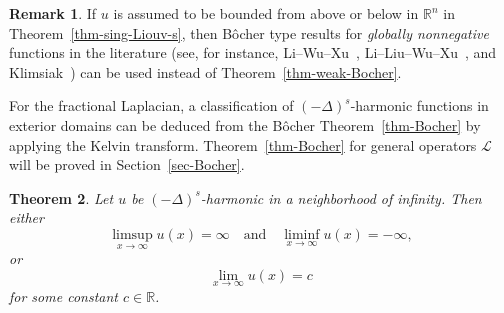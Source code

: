 \documentclass[11pt]{amsart}
\theoremstyle{plain}
\newtheorem{theorem}{Theorem}[section]
\theoremstyle{definition}
\newtheorem{remark}[theorem]{Remark}
\numberwithin{equation}{section}
\begin{document}
\begin{remark}
    If $u$ is assumed to be bounded from above or below in $\mathbb{R}^n$ in Theorem~\ref{thm-sing-Liouv-s}, then B\^ocher type results for \emph{globally nonnegative} functions in the literature (see, for instance, Li--Wu--Xu~\cite[Theorem~4]{LWX18}, Li--Liu--Wu--Xu~\cite[Theorem~1.3]{LLWX20}, and Klimsiak~\cite{Kli25}) can be used instead of Theorem~\ref{thm-weak-Bocher}.
\end{remark}

For the fractional Laplacian, a classification of $(-\Delta)^s$-harmonic functions in exterior domains can be deduced from the B\^ocher Theorem~\ref{thm-Bocher} by applying the Kelvin transform. Theorem~\ref{thm-Bocher} for general operators $\mathcal{L}$ will be proved in Section~\ref{sec-Bocher}.

\begin{theorem}
Let $u$ be $(-\Delta)^s$-harmonic in a neighborhood of infinity. Then either
\begin{equation}\label{eq-limsupinf}
    \limsup_{x \to \infty} u(x) = \infty \quad\text{and}\quad \liminf_{x \to \infty} u(x) = -\infty,
\end{equation}
or
\begin{equation*}
    \lim_{x \to \infty} u(x) = c
\end{equation*}
for some constant $c \in \mathbb{R}$.
\end{theorem}
\end{document}
